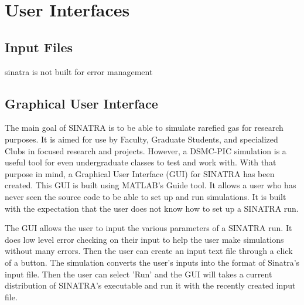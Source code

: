 \section{User Interfaces}
\subsection{Input Files}
sinatra is not built for error management
\subsection{Graphical User Interface}
The main goal of SINATRA is to be able to simulate rarefied gas for research purposes. It is aimed for use by Faculty, Graduate Students, and specialized Clubs in focused research and projects. However, a DSMC-PIC simulation is a useful tool for even undergraduate classes to test and work with. With that purpose in mind, a Graphical User Interface (GUI) for SINATRA has been created. This GUI is built using MATLAB's Guide tool. It allows a user who has never seen the source code to be able to set up and run simulations. It is built with the expectation that the user does not know how to set up a SINATRA run. \par
The GUI allows the user to input the various parameters of a SINATRA run. It does low level error checking on their input to help the user make simulations without many errors. Then the user can create an input text file through a click of a button. The simulation converts the user's inputs into the format of Sinatra's input file. Then the user can select 'Run' and the GUI will takes a current distribution of SINATRA's executable and run it with the recently created input file.

